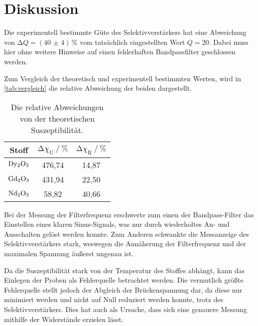 \section{Diskussion}
\label{sec:Diskussion}

Die experimentell bestimmte Güte des Selektivverstärkers hat eine Abweichung von $\increment Q = (\num{40(4)}) \, \% $ vom tatsächlich eingestellten Wert $Q = 20$.
Dabei muss hier ohne weitere Hinweise auf einen fehlerhaften Bandpassfilter geschlossen werden.

Zum Vergleich der theoretisch und experimentell bestimmten Werten, 
wird in \autoref{tab:vergleich} die relative Abweichung der beiden dargestellt.
\begin{table}
    \centering
    \caption{Die relative Abweichungen von der theoretischen Suszeptibilität.}
    \label{tab:vergleich}
    \begin{tabular}{c c c}
        \toprule
        Stoff &  
        $\increment \chi_\text{U} \mathbin{/} \%$ & 
        $\increment \chi_\text{R} \mathbin{/} \%$ \\
        \midrule
        $\ce{Dy2O3}$ &   476,74 &    14,87 \\
        $\ce{Gd2O3}$ &   431,94 &    22,50 \\
        $\ce{Nd2O3}$ &    58,82 &    40,66 \\
        \bottomrule
    \end{tabular}
\end{table}

Bei der Messung der Filterfrequenz erschwerte zum einen der Bandpass-Filter das Einstellen eines klaren Sinus-Signals, 
was nur durch wiederholtes An- und Ausschalten gelöst werden konnte.
Zum Anderen schwankte die Messanzeige des Selektivverstärkers stark, 
weswegen die Annäherung der Filterfrequenz und der maximalen Spannung äußerst ungenau ist.

Da die Suszeptibilität stark von der Temperatur des Stoffes abhängt, kann das Einlegen der Proben als Fehlerquelle betrachtet werden.
Die vermutlich größte Fehlerquelle stellt jedoch der Abgleich der Brückenspannung dar, 
da diese nur minimiert werden und nicht auf Null reduziert werden konnte, trotz des Selektivverstärkers. 
Dies hat auch als Ursache, dass sich eine genauere Messung mithilfe der Widerstände erzielen lässt.